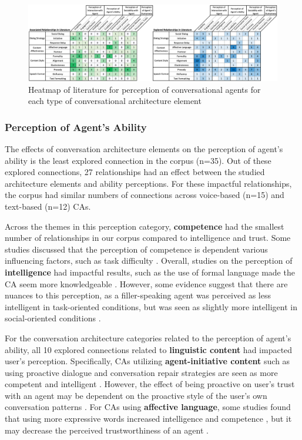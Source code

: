 \documentclass[sigconf,screen,review, anonymous]{acmart}
\newcommand{\cmt}[1]{}%
\begin{document}
\begin{figure}[]
  \centering
  \includegraphics[width=\textwidth]{fig-heatmap-coverage.png}
  \caption{Heatmap of literature for perception of conversational agents for each type of conversational architecture element}
  \label{fig:heatmap-coverage}
\end{figure}

\subsubsection{Perception of Agent's Ability}

The effects of conversation architecture elements on the perception of agent's ability is the least explored connection in the corpus (n=35). Out of these explored connections, 27 relationships had an effect between the studied architecture elements and ability perceptions. For these impactful relationships, the corpus had similar numbers of connections across voice-based (n=15) and text-based (n=12) CAs.

Across the themes in this perception category, \textbf{competence} had the smallest number of relationships in our corpus compared to intelligence and trust. Some studies discussed that the perception of competence is dependent various influencing factors, such as task difficulty \cite{kraus2020effects}\cmt{[64]}. Overall, studies on the perception of \textbf{intelligence} had impactful results, such as the use of formal language made the CA seem more knowledgeable \cite{volkel2022user}\cmt{[75]}. However, some evidence suggest that there are nuances to this perception, as a filler-speaking agent was perceived as less intelligent in task-oriented conditions, but was seen as slightly more intelligent in social-oriented conditions \cite{jeong2019exploring}\cmt{[10]}.

For the conversation architecture categories related to the perception of agent's ability, all 10 explored connections related to \textbf{linguistic content} had impacted user's perception. Specifically, CAs utilizing \textbf{agent-initiative content} such as using proactive dialogue and conversation repair strategies are seen as more competent \cite{kraus2020effects}\cmt{[64]} and intelligent \cite{ashktorab2019resilient}\cmt{[88]}. However, the effect of being proactive on user's trust with an agent may be dependent on the proactive style of the user's own conversation patterns \cite{kraus2020effects}\cmt{[64]}. For CAs using \textbf{affective language}, some studies found that using more expressive words increased intelligence and competence \cite{lee2019s}\cmt{[55]}\cite{yang2017perceived}\cmt{[44]}, but it may decrease the perceived trustworthiness of an agent 
\cite{healey2013relating}\cmt{[39]}.
\end{document}
